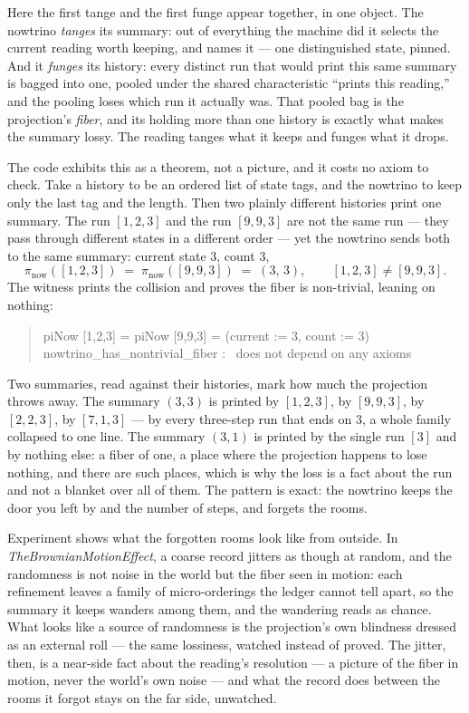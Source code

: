 Here the first tange and the first funge appear together, in one object.
The nowtrino \emph{tanges} its summary: out of everything the machine did it selects the current reading worth keeping,
and names it --- one distinguished state, pinned.
And it \emph{funges} its history: every distinct run that would print this same summary is bagged into one, pooled under
the shared characteristic ``prints this reading,'' and the pooling loses which run it actually was.
That pooled bag is the projection's \emph{fiber}, and its holding more than one history is exactly what makes the summary
lossy.
The reading tanges what it keeps and funges what it drops.

The code exhibits this as a theorem, not a picture, and it costs no axiom to check.
Take a history to be an ordered list of state tags, and the nowtrino to keep only the last tag and the length.
Then two plainly different histories print one summary.
The run $[1,2,3]$ and the run $[9,9,3]$ are not the same run --- they pass through different states in a different order
--- yet the nowtrino sends both to the same summary: current state $3$, count $3$,
\[
  \pi_{\text{now}}([1,2,3]) \;=\; \pi_{\text{now}}([9,9,3]) \;=\; (3,\,3), \qquad [1,2,3] \neq [9,9,3] .
\]
The witness prints the collision and proves the fiber is non-trivial, leaning on nothing:
\begin{quote}\ttfamily
piNow [1,2,3] = piNow [9,9,3] = (current := 3, count := 3)\\
nowtrino\_has\_nontrivial\_fiber : \ does not depend on any axioms
\end{quote}

Two summaries, read against their histories, mark how much the projection throws away.
The summary $(3,3)$ is printed by $[1,2,3]$, by $[9,9,3]$, by $[2,2,3]$, by $[7,1,3]$ --- by every three-step run that
ends on $3$, a whole family collapsed to one line.
The summary $(3,1)$ is printed by the single run $[3]$ and by nothing else: a fiber of one, a place where the projection
happens to lose nothing, and there are such places, which is why the loss is a fact about the run and not a blanket over
all of them.
The pattern is exact: the nowtrino keeps the door you left by and the number of steps, and forgets the rooms.

Experiment shows what the forgotten rooms look like from outside.
In \emph{TheBrownianMotionEffect}, a coarse record jitters as though at random, and the randomness is not noise in the
world but the fiber seen in motion: each refinement leaves a family of micro-orderings the ledger cannot tell apart, so
the summary it keeps wanders among them, and the wandering reads as chance.
What looks like a source of randomness is the projection's own blindness dressed as an external roll --- the same
lossiness, watched instead of proved.
The jitter, then, is a near-side fact about the reading's resolution --- a picture of the fiber in motion, never the
world's own noise --- and what the record does between the rooms it forgot stays on the far side, unwatched.

